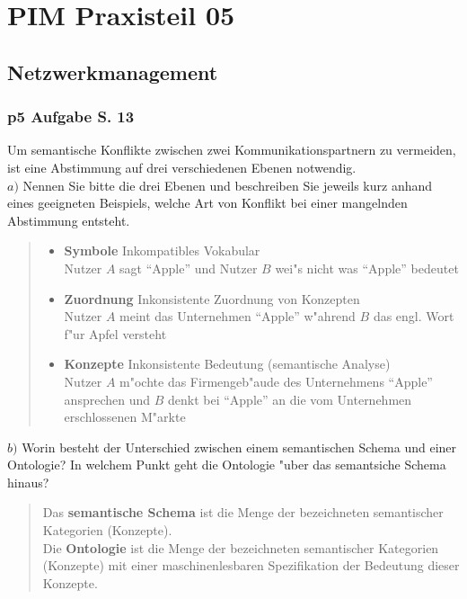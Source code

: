 
\chapter{PIM Praxisteil 05}

\section{Netzwerkmanagement}

\subsection{p5 Aufgabe S. 13}
Um semantische Konflikte zwischen zwei Kommunikationspartnern zu vermeiden, ist eine Abstimmung auf drei verschiedenen Ebenen notwendig.\\

\noindent
$a)$ Nennen Sie bitte die drei Ebenen und beschreiben Sie jeweils kurz anhand eines geeigneten Beispiels, welche Art von Konflikt bei einer mangelnden Abstimmung entsteht.\\
\begin{quote}
    \begin{itemize}
        \item \textbf{Symbole} Inkompatibles Vokabular\\
        Nutzer $A$ sagt "`Apple"' und Nutzer $B$ wei"s nicht was "`Apple"' bedeutet
        \item \textbf{Zuordnung} Inkonsistente Zuordnung von Konzepten\\
        Nutzer $A$ meint das Unternehmen "`Apple"' w"ahrend $B$ das engl. Wort f"ur Apfel versteht
        \item \textbf{Konzepte} Inkonsistente Bedeutung (semantische Analyse)\\
        Nutzer $A$ m"ochte das Firmengeb"aude des Unternehmens "`Apple"' ansprechen und $B$ denkt bei "`Apple"' an die vom Unternehmen erschlossenen M"arkte
    \end{itemize}
\end{quote}
\bigskip

\noindent
$b)$ Worin besteht der Unterschied zwischen einem semantischen Schema und einer Ontologie?
In welchem Punkt geht die Ontologie "uber das semantsiche Schema hinaus?\\
\begin{quote}
    Das \textbf{semantische Schema} ist die Menge der bezeichneten semantischer Kategorien (Konzepte).\\
    Die \textbf{Ontologie} ist die Menge der bezeichneten semantischer Kategorien (Konzepte) mit einer maschinenlesbaren Spezifikation der Bedeutung dieser Konzepte.
\end{quote}
\bigskip


